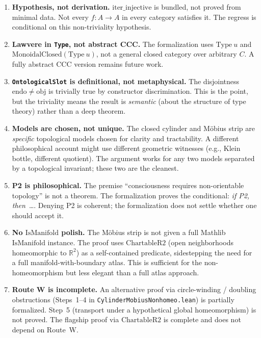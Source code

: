 \documentclass[11pt]{article}
\newcommand{\leanref}[1]{\texttt{\small #1}}
\begin{document}
\begin{enumerate}
\item \textbf{Hypothesis, not derivation.} $\mathrm{iter\_injective}$ is bundled, not proved from minimal data. Not every $f : A \to A$ in every category satisfies it. The regress is conditional on this non-triviality hypothesis.

\item \textbf{Lawvere in \texttt{Type}, not abstract CCC.} The formalization uses $\mathrm{Type}\ u$ and $\mathrm{MonoidalClosed}(\mathrm{Type}\ u)$, not a general closed category over arbitrary $C$. A fully abstract CCC version remains future work.

\item \textbf{\texttt{OntologicalSlot} is definitional, not metaphysical.} The disjointness $\mathrm{endo} \neq \mathrm{obj}$ is trivially true by constructor discrimination. This is the point, but the triviality means the result is \emph{semantic} (about the structure of type theory) rather than a deep theorem.

\item \textbf{Models are chosen, not unique.} The closed cylinder and M\"obius strip are \emph{specific} topological models chosen for clarity and tractability. A different philosophical account might use different geometric witnesses (e.g., Klein bottle, different quotient). The argument works for any two models separated by a topological invariant; these two are the cleanest.

\item \textbf{P2 is philosophical.} The premise ``consciousness requires non-orientable topology'' is not a theorem. The formalization proves the conditional: \emph{if P2, then}~\ldots{}. Denying P2 is coherent; the formalization does not settle whether one should accept it.

\item \textbf{No $\mathrm{IsManifold}$ polish.} The M\"obius strip is not given a full Mathlib $\mathrm{IsManifold}$ instance. The proof uses $\mathrm{ChartableR2}$ (open neighborhoods homeomorphic to $\mathbb{R}^2$) as a self-contained predicate, sidestepping the need for a full manifold-with-boundary atlas. This is sufficient for the non-homeomorphism but less elegant than a full atlas approach.

\item \textbf{Route W is incomplete.} An alternative proof via circle-winding / doubling obstructions (Steps~1--4 in \leanref{CylinderMobiusNonhomeo.lean}) is partially formalized. Step~5 (transport under a hypothetical global homeomorphism) is not proved. The flagship proof via $\mathrm{ChartableR2}$ is complete and does not depend on Route~W.
\end{enumerate}
\end{document}
